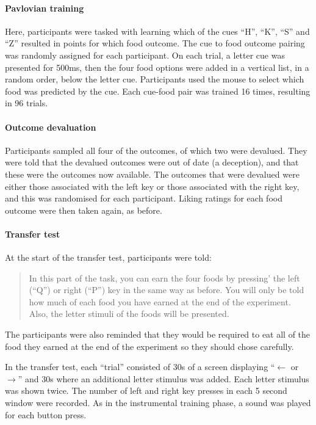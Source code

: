 \documentclass[12pt]{article}
\begin{document}
\paragraph{Pavlovian training}
Here, participants were tasked with learning which of the cues ``H'', ``K'',
``S'' and ``Z'' resulted in points for which food outcome. The cue to food
outcome pairing was randomly assigned for each participant. On each trial, a
letter cue was presented for 500ms, then the four food options were added in a
vertical list, in a random order, below the letter cue. Participants used the
mouse to select which food was predicted by the cue. Each cue-food pair was
trained 16 times, resulting in 96 trials.

\paragraph{Outcome devaluation}
Participants sampled all four of the outcomes, of which two were devalued. They
were told that the devalued outcomes were out of date (a deception), and that
these were the outcomes now available. The outcomes that were devalued were
either those associated with the left key or those associated with the right
key, and this was randomised for each participant. Liking ratings for each food
outcome were then taken again, as before. 

\paragraph{Transfer test}
At the start of the transfer test, participants were told: 

\blockquote{In this part of the task, you can earn the four foods by pressing'
the left (``Q'') or right (``P'') key in the same way as before. You will only
be told how much of each food you have earned at the end of the experiment.
Also, the letter stimuli of the foods will be presented.}

The participants were also reminded that they would be required to eat all of
the food they earned at the end of the experiment so they should chose
carefully. 

In the transfer test, each ``trial'' consisted of 30s of a screen displaying
``$\leftarrow$ or $\rightarrow$'' and 30s where an additional letter stimulus
was added. Each letter stimulus was shown twice. The number of left and right
key presses in each 5 second window were recorded. As in the instrumental
training phase, a sound was played for each button press.
\end{document}
